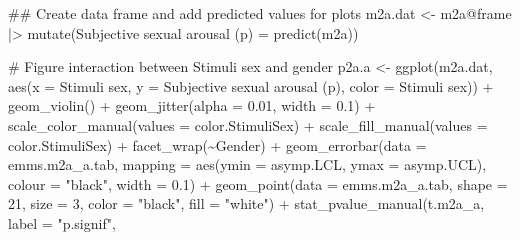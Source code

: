\documentclass[
  bookmarksnumbered]{article}
\newenvironment{Shaded}{\begin{snugshade}}{\end{snugshade}}
\newcommand{\AttributeTok}[1]{\textcolor[rgb]{0.80,0.80,0.80}{#1}}
\newcommand{\CommentTok}[1]{\textcolor[rgb]{0.50,0.62,0.50}{#1}}
\newcommand{\DecValTok}[1]{\textcolor[rgb]{0.86,0.86,0.80}{#1}}
\newcommand{\DocumentationTok}[1]{\textcolor[rgb]{0.50,0.62,0.50}{#1}}
\newcommand{\FloatTok}[1]{\textcolor[rgb]{0.75,0.75,0.82}{#1}}
\newcommand{\FunctionTok}[1]{\textcolor[rgb]{0.94,0.94,0.56}{#1}}
\newcommand{\NormalTok}[1]{\textcolor[rgb]{0.80,0.80,0.80}{#1}}
\newcommand{\OtherTok}[1]{\textcolor[rgb]{0.94,0.94,0.56}{#1}}
\newcommand{\SpecialCharTok}[1]{\textcolor[rgb]{0.86,0.64,0.64}{#1}}
\newcommand{\StringTok}[1]{\textcolor[rgb]{0.80,0.58,0.58}{#1}}
\begin{document}
\begin{Shaded}
\begin{Highlighting}[]
\DocumentationTok{\#\# Create data frame and add predicted values for plots}
\NormalTok{m2a.dat }\OtherTok{\textless{}{-}}\NormalTok{ m2a}\SpecialCharTok{@}\NormalTok{frame }\SpecialCharTok{|\textgreater{}} 
  \FunctionTok{mutate}\NormalTok{(}\StringTok{\textasciigrave{}}\AttributeTok{Subjective sexual arousal (p)}\StringTok{\textasciigrave{}} \OtherTok{=} \FunctionTok{predict}\NormalTok{(m2a))}

\CommentTok{\# Figure interaction between Stimuli sex and gender}
\NormalTok{p2a.a }\OtherTok{\textless{}{-}} \FunctionTok{ggplot}\NormalTok{(m2a.dat, }\FunctionTok{aes}\NormalTok{(}\AttributeTok{x =} \StringTok{\textasciigrave{}}\AttributeTok{Stimuli sex}\StringTok{\textasciigrave{}}\NormalTok{, }
                             \AttributeTok{y =} \StringTok{\textasciigrave{}}\AttributeTok{Subjective sexual arousal (p)}\StringTok{\textasciigrave{}}\NormalTok{, }
                             \AttributeTok{color =} \StringTok{\textasciigrave{}}\AttributeTok{Stimuli sex}\StringTok{\textasciigrave{}}\NormalTok{)) }\SpecialCharTok{+}
  \FunctionTok{geom\_violin}\NormalTok{() }\SpecialCharTok{+}
  \FunctionTok{geom\_jitter}\NormalTok{(}\AttributeTok{alpha =} \FloatTok{0.01}\NormalTok{, }\AttributeTok{width =} \FloatTok{0.1}\NormalTok{) }\SpecialCharTok{+}
  \FunctionTok{scale\_color\_manual}\NormalTok{(}\AttributeTok{values =}\NormalTok{ color.StimuliSex) }\SpecialCharTok{+}
  \FunctionTok{scale\_fill\_manual}\NormalTok{(}\AttributeTok{values =}\NormalTok{ color.StimuliSex) }\SpecialCharTok{+}
  \FunctionTok{facet\_wrap}\NormalTok{(}\SpecialCharTok{\textasciitilde{}}\NormalTok{Gender) }\SpecialCharTok{+}
  \FunctionTok{geom\_errorbar}\NormalTok{(}\AttributeTok{data =}\NormalTok{ emms.m2a\_a.tab, }
                \AttributeTok{mapping =} \FunctionTok{aes}\NormalTok{(}\AttributeTok{ymin =}\NormalTok{ asymp.LCL, }\AttributeTok{ymax =}\NormalTok{ asymp.UCL), }
                \AttributeTok{colour =} \StringTok{"black"}\NormalTok{, }\AttributeTok{width =} \FloatTok{0.1}\NormalTok{) }\SpecialCharTok{+}
  \FunctionTok{geom\_point}\NormalTok{(}\AttributeTok{data =}\NormalTok{ emms.m2a\_a.tab, }
             \AttributeTok{shape =} \DecValTok{21}\NormalTok{, }\AttributeTok{size =} \DecValTok{3}\NormalTok{,}
             \AttributeTok{color =} \StringTok{"black"}\NormalTok{, }\AttributeTok{fill =} \StringTok{"white"}\NormalTok{) }\SpecialCharTok{+}
  \FunctionTok{stat\_pvalue\_manual}\NormalTok{(t.m2a\_a, }
                     \AttributeTok{label =} \StringTok{"p.signif"}\NormalTok{, }

\end{Highlighting}
\end{Shaded}
\end{document}
